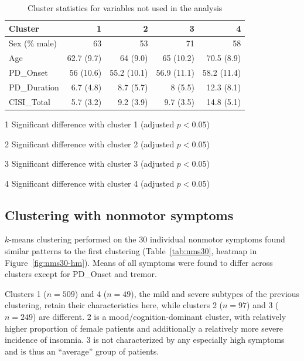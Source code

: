 \documentclass[preprint,3p,twocolumn]{elsarticle} %
\begin{document}
\begin{table}[t]
  \centering
  \caption{Cluster statistics for variables not used in the analysis}
  \label{tab:nmd_extra}
  \begin{threeparttable}
  \begin{tabular}{l r r r r}
    \toprule
    Cluster & 1 & 2 & 3 & 4 \\
    \midrule
      Sex (\% male) & 63 & 53\tnote{3} & 71\tnote{2} & 58 \\
      Age & 62.7 (9.7)\tnote{34} & 64 (9.0)\tnote{4} & 65 (10.2)\tnote{14} & 70.5 (8.9)\tnote{123} \\
      PD\_Onset & 56 (10.6) & 55.2 (10.1) & 56.9 (11.1) & 58.2 (11.4) \\
      PD\_Duration & 6.7 (4.8)\tnote{234} & 8.7 (5.7)\tnote{14} & 8 (5.5)\tnote{14} & 12.3
      (8.1)\tnote{123} \\
      CISI\_Total & 5.7 (3.2)\tnote{234} & 9.2 (3.9)\tnote{14} & 9.7 (3.5)\tnote{14} & 14.8
      (5.1)\tnote{123} \\
    \bottomrule
  \end{tabular}
  \begin{tablenotes}
    \small
    \item[1] Significant difference with cluster 1 (adjusted $p < 0.05$)
    \item[2] Significant difference with cluster 2 (adjusted $p < 0.05$)
    \item[3] Significant difference with cluster 3 (adjusted $p < 0.05$)
    \item[4] Significant difference with cluster 4 (adjusted $p < 0.05$)
  \end{tablenotes}
  \end{threeparttable}
\end{table}

\subsection{Clustering with nonmotor symptoms}

$k$-means clustering performed on the 30 individual nonmotor symptoms found similar patterns to the
first clustering (Table~\ref{tab:nms30}, heatmap in Figure~\ref{fig:nms30-hm}). Means of all symptoms were found to
differ across clusters except for PD\_Onset and tremor.

Clusters 1 ($n = 509$) and 4 ($n = 49$), the mild and severe subtypes of the previous clustering,
retain their characteristics here, while clusters 2 ($n = 97$) and 3 ($n = 249$) are different. 2
is a mood/cognition-dominant cluster, with relatively higher proportion of female patients and
additionally a relatively more severe incidence of insomnia. 3 is not characterized by any
especially high symptoms and is thus an ``average'' group of patients.
\end{document}
